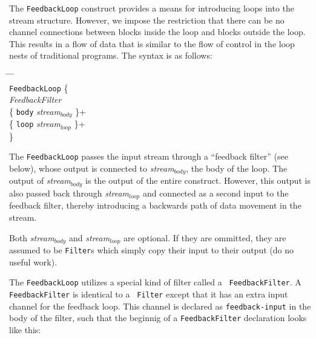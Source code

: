 \documentclass[draft]{article}
\begin{document}
The {\tt FeedbackLoop} construct provides a means for introducing
loops into the stream structure.  However, we impose the restriction
that there can be no channel connections between blocks inside the
loop and blocks outside the loop.  This results in a flow of data that
is similar to the flow of control in the loop nests of traditional
programs.  The syntax is as follows:

\begin{tabbing}
\hspace{0.2in} \= \hspace{0.2in} \= \hspace{0.2in} \= \hspace{0.2in} \= \\

{\tt FeedbackLoop} \{ \\
\> {\it FeedbackFilter} \\
\> \{ {\tt body} {\it stream$_{body}$} \}+ \\
\> \{ {\tt loop} {\it stream$_{loop}$} \}+ \\
\}
\end{tabbing}

The {\tt FeedbackLoop} passes the input stream through a ``feedback
filter'' (see below), whose output is connected to {\it
stream$_{body}$}, the body of the loop.  The output of {\it
stream$_{body}$} is the output of the entire construct.  However, this
output is also passed back through {\it stream$_{loop}$} and connected
as a second input to the feedback filter, thereby introducing a
backwards path of data movement in the stream.

Both {\it stream$_{body}$} and {\it stream$_{loop}$} are optional.
If they are ommitted, they are assumed to be {\tt Filter}s which simply
copy their input to their output (do no useful work).

\medskip
{}
\medskip

The {\tt FeedbackLoop} utilizes a special kind of filter called a {\tt
FeedbackFilter}.  A {\tt FeedbackFilter} is identical to a {\tt
Filter} except that it has an extra input channel for the feedback
loop.  This channel is declared as {\tt feedback-input} in the body of
the filter, such that the beginnig of a {\tt FeedbackFilter}
declaration looks like this:
\end{document}
